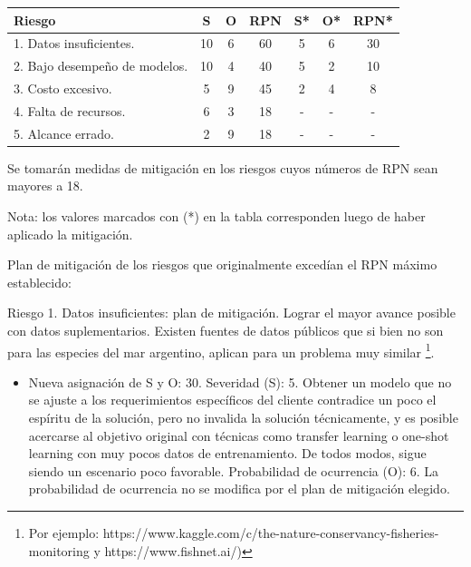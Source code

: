 \documentclass[11pt]{charter}
\begin{document}
\begin{table}[htpb]
\centering
\begin{tabularx}{\linewidth}{@{}|X|c|c|c|c|c|c|@{}}
\hline
\rowcolor[HTML]{C0C0C0} 
Riesgo                        & S  &  O & RPN & S* & O* & RPN* \\ \hline
1. Datos insuficientes. 	  & 10 &  6 & 60  & 5  & 6  & 30   \\ \hline
2. Bajo desempeño de modelos. & 10 &  4 & 40  & 5  & 2  & 10   \\ \hline
3. Costo excesivo. 			  &  5 &  9 & 45  & 2  & 4  & 8    \\ \hline
4. Falta de recursos. 		  &  6 &  3 & 18  & -  & -  & -    \\ \hline
5. Alcance errado. 			  &  2 &  9 & 18  & -  & -  & -    \\ \hline
\end{tabularx}%
\end{table}

Se tomarán medidas de mitigación en los riesgos cuyos números de RPN sean mayores a 18.

Nota: los valores marcados con (*) en la tabla corresponden luego de haber aplicado la
mitigación.

Plan de mitigación de los riesgos que originalmente excedían el RPN máximo establecido:

Riesgo 1. Datos insuficientes: plan de mitigación. Lograr el mayor avance posible con datos suplementarios. Existen fuentes de datos públicos que si bien no son para las especies del mar argentino, aplican para un problema muy similar \footnote{Por ejemplo: https://www.kaggle.com/c/the-nature-conservancy-fisheries-monitoring y https://www.fishnet.ai/)}.
\begin{itemize}
	\item Nueva asignación de S y O: 30.
	\subitem Severidad (S): 5. Obtener un modelo que no se ajuste a los requerimientos específicos del cliente contradice un poco el espíritu de la solución, pero no invalida la solución técnicamente, y es posible acercarse al objetivo original con técnicas como transfer learning o one-shot learning con muy pocos datos de entrenamiento. De todos modos, sigue siendo un escenario poco favorable.
	\subitem Probabilidad de ocurrencia (O): 6. La probabilidad de ocurrencia no se modifica por el plan de mitigación elegido.
\end{itemize}
\end{document}
